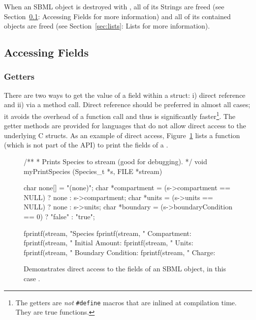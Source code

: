 \documentclass{sbmlmanual}
\begin{document}
When an SBML object is destroyed with , all of its
Strings are freed (see Section~\ref{sec:accessing-fields}: Accessing
Fields for more information) and all of its contained objects are
freed (see Section~\ref{sec:lists}: Lists for more information).


\subsection{Accessing Fields}
\label{sec:accessing-fields}


\subsubsection{Getters}

There are two ways to get the value of a field within a struct: i)
direct reference and ii) via a method call.  Direct reference should
be preferred in almost all cases; it avoids the overhead of a function
call and thus is significantly faster\footnote{The getters are
\emph{not} \texttt{\#define} macros that are inlined at compilation
time.  They are true functions.}.  The getter methods are provided for
languages that do not allow direct access to the underlying C structs.
As an example of direct access, Figure~\ref{fig:print-species} lists a
function (which is not part of the API) to print the fields of a
.


\begin{figure}[htb]
  \begin{codeVerbatim}[C,flexiblecolumns=false]
/**
 * Prints Species to stream (good for debugging).
 */
void
myPrintSpecies (Species_t *s, FILE *stream)
{
  char none[]       = "(none)";
  char *compartment = (s->compartment == NULL) ? none : s->compartment;
  char *units       = (s->units       == NULL) ? none : s->units;
  char *boundary    = (s->boundaryCondition == 0) ? "false" : "true";


  fprintf(stream, "Species %
  fprintf(stream, "         Compartment: %
  fprintf(stream, "      Initial Amount: %
  fprintf(stream, "               Units: %
  fprintf(stream, "  Boundary Condition: %
  fprintf(stream, "              Charge: %
}
  \end{codeVerbatim}
  \caption{Demonstrates direct access to the fields of an SBML object,
  in this case .}
  \label{fig:print-species}
\end{figure}
\end{document}
